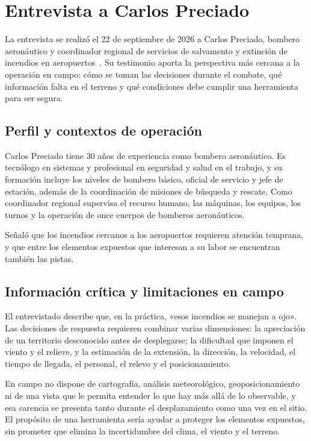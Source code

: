 \section{Entrevista a Carlos Preciado}\label{sec:preciado}

La entrevista se realizó el 22 de septiembre de 2026 a Carlos Preciado, bombero aeronáutico y coordinador regional de servicios de salvamento y extinción de incendios en aeropuertos~\cite{entrevistaPreciado2026}. Su testimonio aporta la perspectiva más cercana a la operación en campo: cómo se toman las decisiones durante el combate, qué información falta en el terreno y qué condiciones debe cumplir una herramienta para ser segura.

\subsection{Perfil y contextos de operación}

Carlos Preciado tiene 30 años de experiencia como bombero aeronáutico. Es tecnólogo en sistemas y profesional en seguridad y salud en el trabajo, y su formación incluye los niveles de bombero básico, oficial de servicio y jefe de estación, además de la coordinación de misiones de búsqueda y rescate. Como coordinador regional supervisa el recurso humano, las máquinas, los equipos, los turnos y la operación de once cuerpos de bomberos aeronáuticos.

Señaló que los incendios cercanos a los aeropuertos requieren atención temprana, y que entre los elementos expuestos que interesan a su labor se encuentran también las pistas.

\subsection{Información crítica y limitaciones en campo}

El entrevistado describe que, en la práctica, «esos incendios se manejan a ojo». Las decisiones de respuesta requieren combinar varias dimensiones: la apreciación de un territorio desconocido antes de desplegarse; la dificultad que imponen el viento y el relieve, y la estimación de la extensión, la dirección, la velocidad, el tiempo de llegada, el personal, el relevo y el posicionamiento.

En campo no dispone de cartografía, análisis meteorológico, geoposicionamiento ni de una vista que le permita entender lo que hay más allá de lo observable, y esa carencia se presenta tanto durante el desplazamiento como una vez en el sitio. El propósito de una herramienta sería ayudar a proteger los elementos expuestos, sin prometer que elimina la incertidumbre del clima, el viento y el terreno.

